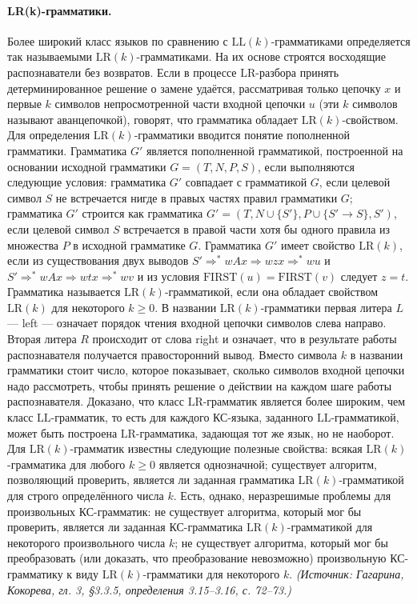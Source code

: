 \documentclass[a4paper,12pt]{article}
\begin{document}
\paragraph{LR(k)-грамматики.}
Более широкий класс языков по сравнению с \(\mathrm{LL}(k)\)-грамматиками определяется так называемыми \(\mathrm{LR}(k)\)-грамматиками. На их основе строятся восходящие распознаватели без возвратов. Если в процессе \(\mathrm{LR}\)-разбора принять детерминированное решение о замене удаётся, рассматривая только цепочку \(x\) и первые \(k\) символов непросмотренной части входной цепочки \(u\) (эти \(k\) символов называют аванцепочкой), говорят, что грамматика обладает \(\mathrm{LR}(k)\)-свойством. Для определения \(\mathrm{LR}(k)\)-грамматики вводится понятие пополненной грамматики. Грамматика \(G'\) является пополненной грамматикой, построенной на основании исходной грамматики \(G=(T,N,P,S)\), если выполняются следующие условия: грамматика \(G'\) совпадает с грамматикой \(G\), если целевой символ \(S\) не встречается нигде в правых частях правил грамматики \(G\); грамматика \(G'\) строится как грамматика \(G'=(T,N\cup\{S'\},P\cup\{S'\to S\},S')\), если целевой символ \(S\) встречается в правой части хотя бы одного правила из множества \(P\) в исходной грамматике \(G\). Грамматика \(G'\) имеет свойство \(\mathrm{LR}(k)\), если из существования двух выводов \(S'\Rightarrow^*wAx\Rightarrow wzx\Rightarrow^*wu\) и \(S'\Rightarrow^*wAx\Rightarrow wtx\Rightarrow^*wv\) и из условия \(\mathrm{FIRST}(u)=\mathrm{FIRST}(v)\) следует \(z=t\). Грамматика называется \(\mathrm{LR}(k)\)-грамматикой, если она обладает свойством \(\mathrm{LR}(k)\) для некоторого \(k\ge0\). В названии \(\mathrm{LR}(k)\)-грамматики первая литера \(L\) — left — означает порядок чтения входной цепочки символов слева направо. Вторая литера \(R\) происходит от слова right и означает, что в результате работы распознавателя получается правосторонний вывод. Вместо символа \(k\) в названии грамматики стоит число, которое показывает, сколько символов входной цепочки надо рассмотреть, чтобы принять решение о действии на каждом шаге работы распознавателя. Доказано, что класс \(\mathrm{LR}\)-грамматик является более широким, чем класс \(\mathrm{LL}\)-грамматик, то есть для каждого КС-языка, заданного \(\mathrm{LL}\)-грамматикой, может быть построена \(\mathrm{LR}\)-грамматика, задающая тот же язык, но не наоборот. Для \(\mathrm{LR}(k)\)-грамматик известны следующие полезные свойства: всякая \(\mathrm{LR}(k)\)-грамматика для любого \(k\ge0\) является однозначной; существует алгоритм, позволяющий проверить, является ли заданная грамматика \(\mathrm{LR}(k)\)-грамматикой для строго определённого числа \(k\). Есть, однако, неразрешимые проблемы для произвольных КС-грамматик: не существует алгоритма, который мог бы проверить, является ли заданная КС-грамматика \(\mathrm{LR}(k)\)-грамматикой для некоторого произвольного числа \(k\); не существует алгоритма, который мог бы преобразовать (или доказать, что преобразование невозможно) произвольную КС-грамматику к виду \(\mathrm{LR}(k)\)-грамматики для некоторого \(k\).
\textit{(Источник: Гагарина, Кокорева, гл. 3, §3.3.5, определения 3.15--3.16, с. 72--73.)}
\end{document}
